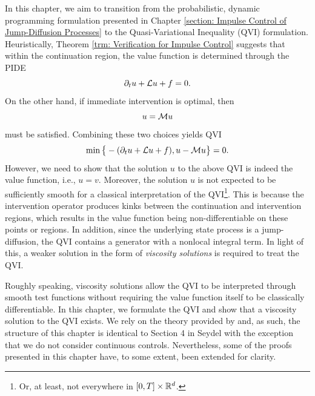 \label{section: Viscosity Solution for Impulse Control: Existence}
In this chapter, we aim to transition from the probabilistic, dynamic programming formulation presented in Chapter \ref{section: Impulse Control of Jump-Diffusion Processes} to the Quasi-Variational Inequality (QVI) formulation. Heuristically, Theorem \ref{trm: Verification for Impulse Control} suggests that within the continuation region, the value function is determined through the PIDE
\begin{equation*}
    \partial_t u + \mathcal{L} u + f = 0.
\end{equation*}
On the other hand, if immediate intervention is optimal, then
\begin{equation*}
    u = \mathcal{M} u
\end{equation*}
must be satisfied. Combining these two choices yields QVI
\begin{equation*}
    \min \big\{-(\partial_t u + \mathcal{L} u + f), u - \mathcal{M} u \big\} = 0.
\end{equation*}
However, we need to show that the solution $u$ to the above QVI is indeed the value function, i.e., $u=v$. Moreover, the solution $u$ is not expected to be sufficiently smooth for a classical interpretation of the QVI\footnote{Or, at least, not everywhere in $[0,T] \times \mathbb{R}^d$.}. This is because the intervention operator produces kinks between the continuation and intervention regions, which results in the value function being non-differentiable on these points or regions. In addition, since the underlying state process is a jump-diffusion, the QVI contains a generator with a nonlocal integral term. In light of this, a weaker solution in the form of \textit{viscosity solutions} is required to treat the QVI.

Roughly speaking, viscosity solutions allow the QVI to be interpreted through smooth test functions without requiring the value function itself to be classically differentiable. In this chapter, we formulate the QVI and show that a viscosity solution to the QVI exists. We rely on the theory provided by \textcite{seydel2010generalexistenceuniquenessviscosity} and, as such, the structure of this chapter is identical to Section 4 in Seydel with the exception that we do not consider continuous controls. Nevertheless, some of the proofs presented in this chapter have, to some extent, been extended for clarity. 


